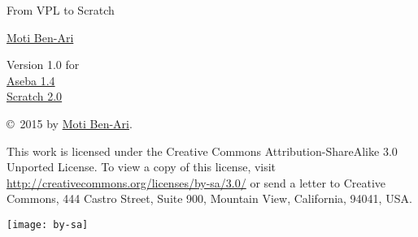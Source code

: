 
\thispagestyle{empty}

\begin{center}
\begin{Huge}
\begin{bfseries}
From VPL to Scratch
\end{bfseries}
\end{Huge}

\vskip 2cm

\begin{LARGE}
\href{http://www.weizmann.ac.il/sci-tea/benari/}{Moti Ben-Ari}\\%
\end{LARGE}

\vskip 1cm

\begin{Large}
Version 1.0 for\\
\bigskip
\href{https://aseba.wikidot.com/en:downloadinstall}{Aseba 1.4}\\
\bigskip
\href{https://scratch.mit.edu/}{Scratch 2.0}
\end{Large}

\end{center}

\vfill

\begin{center}
\copyright{}\  2015 by \href{http://www.weizmann.ac.il/sci-tea/benari/}{Moti Ben-Ari}.%
\end{center}

This work is licensed under the Creative Commons
Attribution-ShareAlike 3.0 Unported License. To view a copy
of this license, visit
\url{http://creativecommons.org/licenses/by-sa/3.0/}
or send a letter to Creative Commons, 444 Castro Street, Suite 900,
Mountain View, California, 94041, USA.

\begin{center}
\texttt{[image: by-sa]}
\end{center}

\newpage
\begin{spacing}{0.7}
\tableofcontents
\end{spacing}
\thispagestyle{empty}
\newpage
\setcounter{page}{1}
